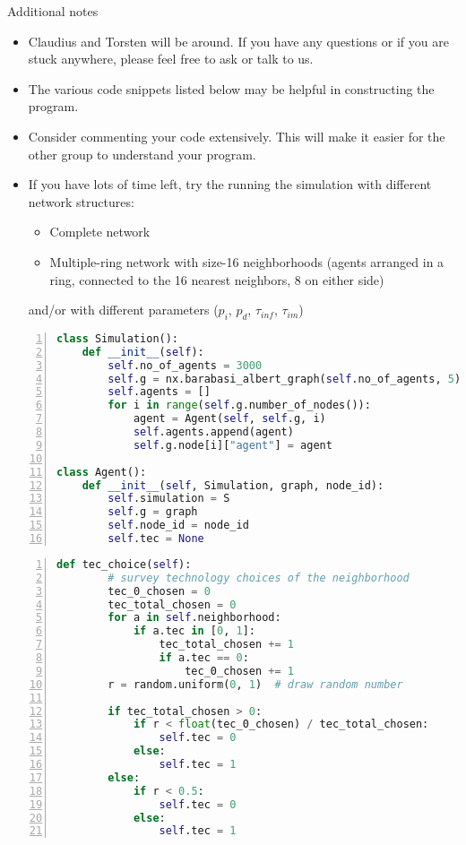 \documentclass[25pt,a4paper]{article}
\begin{document}
$$$$
Additional notes
\begin{itemize}
  \item Claudius and Torsten will be around. If you have any questions or if you are stuck anywhere, please feel free to ask or talk to us.
  \item The various code snippets listed below may be helpful in constructing the program.
  \item Consider commenting your code extensively. This will make it easier for the other group to understand your program.
  \item If you have lots of time left, try the running the simulation with different network structures:
  \begin{itemize}
    \item Complete network
    \item Multiple-ring network with size-16 neighborhoods (agents arranged in a ring, connected to the 16 nearest neighbors, 8 on either side)
  \end{itemize}
        and/or with different parameters ($p_i$, $p_d$, $\tau_{inf}$, $\tau_{im}$)
\end{itemize}

\small

\begin{lstlisting}[language=Python,frame=single,numbers=left,title=Script: Possible constructor methods of Simulation class and Agent class]
class Simulation():
    def __init__(self):
        self.no_of_agents = 3000
        self.g = nx.barabasi_albert_graph(self.no_of_agents, 5)
        self.agents = []
        for i in range(self.g.number_of_nodes()):
            agent = Agent(self, self.g, i)
            self.agents.append(agent)
            self.g.node[i]["agent"] = agent

class Agent():
    def __init__(self, Simulation, graph, node_id):
        self.simulation = S
        self.g = graph
        self.node_id = node_id  
        self.tec = None
\end{lstlisting}
\normalsize


\begin{lstlisting}[language=Python,frame=single,numbers=left,title=Script: A possible method for the agent class to choose a method]
    def tec_choice(self):
        # survey technology choices of the neighborhood
        tec_0_chosen = 0
        tec_total_chosen = 0
        for a in self.neighborhood:
            if a.tec in [0, 1]:
                tec_total_chosen += 1
                if a.tec == 0:
                    tec_0_chosen += 1
        r = random.uniform(0, 1)  # draw random number
        
        if tec_total_chosen > 0:  
            if r < float(tec_0_chosen) / tec_total_chosen:
                self.tec = 0
            else:
                self.tec = 1
        else:
            if r < 0.5:
                self.tec = 0
            else:
                self.tec = 1
\end{lstlisting}
\normalsize
\end{document}
